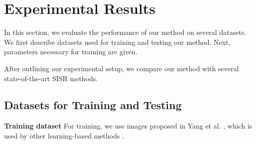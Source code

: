 \documentclass[10pt,twocolumn,letterpaper]{article}
\begin{document}
%
\section{Experimental Results}
In this section, we evaluate the performance of our method on several datasets. We first describe datasets used for training and testing our method. Next, parameters necessary for training are given. 

After outlining our experimental setup, we compare our method with several state-of-the-art SISR methods. 

\subsection{Datasets for Training and Testing}
\textbf{Training dataset} For training, we use images proposed in Yang et al. \cite{yang2010image}, which is used by other learning-based methods \cite{Timofte,Timofte2013,zeyde2012single}. 
\end{document}
